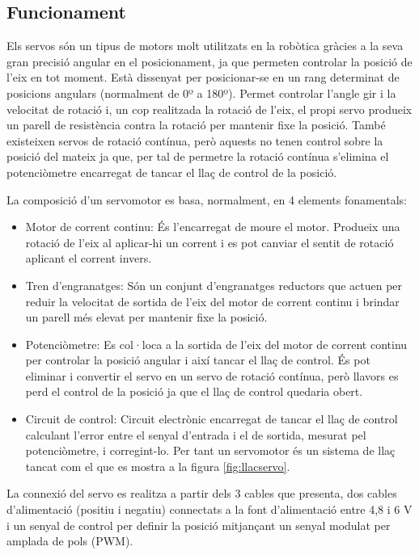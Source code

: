 \subsection{Funcionament}

Els servos són un tipus de motors molt utilitzats en la robòtica gràcies a la seva gran precisió  angular en el posicionament, ja que permeten controlar la posició de l’eix en tot moment. Està dissenyat per posicionar-se en un rang determinat de posicions angulars (normalment de 0º a 180º). Permet controlar l'angle gir i la velocitat de rotació i, un cop realitzada la rotació de l’eix, el propi servo produeix un parell de resistència contra la rotació per mantenir fixe la posició. També existeixen servos de rotació contínua, però aquests no tenen control sobre la posició del mateix ja que, per tal de permetre la rotació contínua s'elimina el potenciòmetre encarregat de tancar el llaç de control de la posició.

La composició d’un servomotor es basa, normalment, en 4 elements fonamentals: 
\begin{itemize}
	
	\item	Motor de corrent continu: És l’encarregat de moure el motor. Produeix una rotació de l’eix al aplicar-hi un corrent i es pot canviar el sentit de rotació aplicant el corrent invers.
	
	\item	Tren d’engranatges: Són un conjunt d’engranatges reductors que actuen per reduir la velocitat de sortida de l’eix del motor de corrent continu i brindar un parell més elevat per mantenir fixe la posició.
	
	\item	Potenciòmetre: Es col·loca a la sortida de l’eix del motor de corrent continu per controlar la posició angular i així tancar el llaç de control. És pot eliminar i convertir el servo en un servo de rotació contínua, però llavors es perd el control de la posició ja que el llaç de control quedaria obert.
	
	\item	Circuit de control:  Circuit electrònic encarregat de tancar el llaç de control calculant l'error entre el senyal d’entrada i el de sortida, mesurat pel potenciòmetre, i corregint-lo. Per tant un servomotor és un sistema de llaç tancat com el que es mostra a la figura \ref{fig:llacservo}. 
	
\end{itemize}

La connexió del servo es realitza a partir dels 3 cables que presenta, dos cables d'alimentació (positiu i negatiu) connectats a la font d’alimentació entre 4,8 i 6 V i un senyal de control per definir la posició mitjançant un senyal modulat per amplada de pols (PWM).

